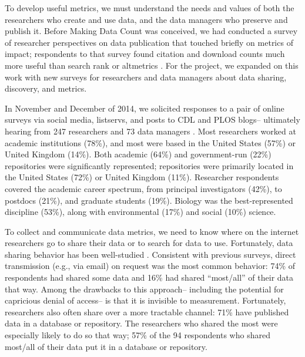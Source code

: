 \documentclass[english]{article}
\begin{document}

To develop useful metrics, we must understand the needs and values of both the researchers who create and use data, and the data managers who preserve and publish it.
Before Making Data Count was conceived, we had conducted a survey of researcher perspectives on data publication that touched briefly on metrics of impact; respondents to that survey found citation and download counts much more useful than search rank or altmetrics \cite{kratz_researcher_2015}.
For the project, we expanded on this work with new surveys for researchers and data managers about data sharing, discovery, and metrics.

In November and December of 2014, we solicited responses to a pair of online surveys via social media, listservs, and posts to CDL and PLOS blogs-- ultimately hearing from 247 researchers and 73 data managers \cite{kratz_making_2015}.
Most researchers worked at academic institutions (78\%), and most were based in the United States (57\%) or United Kingdom (14\%).
Both academic (64\%) and government-run (22\%) repositories were significantly represented; repositories were primarily located in the United States (72\%) or United Kingdom (11\%).
Researcher respondents covered the academic career spectrum, from principal investigators (42\%), to postdocs (21\%), and graduate students (19\%). 
Biology was the best-represented discipline (53\%), along with environmental (17\%) and social (10\%) science. 



To collect and communicate data metrics, we need to know where on the internet researchers go to share their data or to search for data to use. 
Fortunately, data sharing behavior has been well-studied \cite{tenopir_data_2011, akers_disciplinary_2013, wallis_if_2013, aydinoglu_data_2014, kratz_researcher_2015}. 
Consistent with previous surveys, direct transmission (e.g., via email) on request was the most common behavior: 74\% of respondents had shared some data and 16\% had shared ``most/all'' of their data that way.
Among the drawbacks to this approach-- including the potential for capricious denial of access-- is that it is invisible to measurement. 
Fortunately, researchers also often share over a more tractable channel: 71\% have published data in a database or repository.
The researchers who shared the most were especially likely to do so that way; 57\% of the 94 respondents who shared most/all of their data put it in a database or repository.
\end{document}
